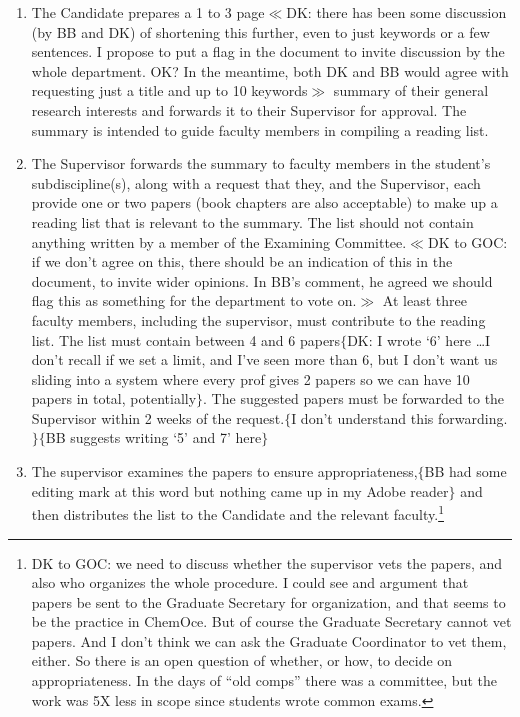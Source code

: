 \documentclass[12pt]{article}
\newcommand{\fixme}[1]{\color{fixmeColor}$\{$#1$\}$\color{black}\index{$>>>>$FIXME$<<<<$}}
\newcommand{\vote}[1]{\color{voteColor}$\ll$#1$\gg$\color{black}\marginpar[$\gg$ vote]{$\ll$ vote}\index{$>>>>$VOTE$<<<<$}}
\newcommand{\discuss}[1]{\footnote{\color{fixmeColor}#1\color{black}}\index{$>>>>$DISCUSS$<<<<$}}
\newcommand{\supervisor}{supervisor\xspace}
\newcommand{\GC}{Graduate Coordinator\xspace}
\newcommand{\GS}{Graduate Secretary\xspace}
\begin{document}
\begin{enumerate}

    \item The Candidate prepares a 1 to 3 page\vote{DK: there has been some
        discussion (by BB and DK) of shortening this further, even to just
        keywords or a few sentences. I propose to put a flag in the document
        to invite discussion by the whole department. OK? In the meantime, both
        DK and BB would agree with requesting just a title and up to 10
        keywords} summary of their general research interests and forwards it
        to their Supervisor for approval.  The summary is intended to guide
        faculty members in compiling a reading list.

    \item The Supervisor forwards the summary to faculty members in the
        student's subdiscipline(s), along with a request that they, and the
        Supervisor, each provide one or two papers (book chapters are also
        acceptable) to make up a reading list that is relevant to the summary.
        The list should not contain anything written by a member of the Examining
        Committee.\vote{DK to GOC: if we don't agree on this, there should be an
        indication of this in the document, to invite wider opinions. In
        BB's comment, he agreed we should flag this as something for the department to vote on.}
        At least three faculty members, including the supervisor, must
        contribute to the reading list. The list must contain between 4 and 6
        papers\fixme{DK: I wrote `6' here \ldots I don't recall if we
        set a limit, and I've seen more than 6, but I don't want us sliding
        into a system where every prof gives 2 papers so we can have 10 papers
        in total, potentially}. The suggested papers must be forwarded to the
        Supervisor within 2 weeks of the request.\fixme{I don't understand
        this forwarding.}\fixme{BB suggests writing `5' and 7' here}

    \item The \supervisor examines the papers to ensure appropriateness,\fixme{BB had some editing mark at this word but nothing came up in my Adobe reader} and then
        distributes the list to the Candidate and the relevant
        faculty.\discuss{DK to GOC: we need to discuss whether the \supervisor vets
        the papers, and also who organizes the whole procedure. I could see
        and argument that papers be sent to the \GS for organization, and that
        seems to be the practice in ChemOce. But of course the \GS cannot vet
        papers. And I don't think we can ask the \GC to vet them, either. So
        there is an open question of whether, or how, to decide on
        appropriateness. In the days of ``old comps'' there was a committee, but
        the work was 5X less in scope since students wrote common exams.}
            

\end{enumerate}
\end{document}
